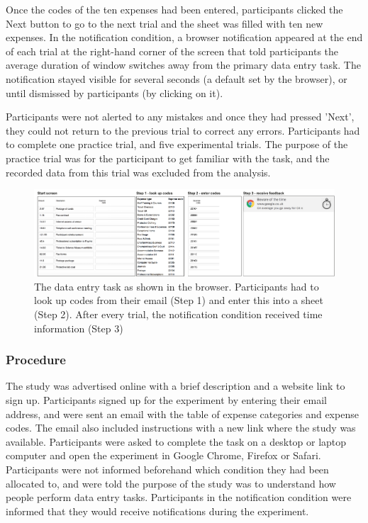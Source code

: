 Once the codes of the ten expenses had been entered, participants clicked the Next button to go to the next trial and the sheet was filled with ten new expenses. In the notification condition, a browser notification appeared at the end of each trial at the right-hand corner of the screen that told participants the average duration of window switches away from the primary data entry task. The notification stayed visible for several seconds (a default set by the browser), or until dismissed by participants (by clicking on it). 

Participants were not alerted to any mistakes and once they had pressed 'Next', they could not return to the previous trial to correct any errors. Participants had to complete one practice trial, and five experimental trials. The purpose of the practice trial was for the participant to get familiar with the task, and the recorded data from this trial was excluded from the analysis.

\begin{figure}
\centering
\includegraphics[width=\textwidth]{images/ch56/ch56-6_taskinterface.pdf}
\caption[Study 6 data entry task layout]{The data entry task as shown in the browser. Participants had to look up codes from their email (Step 1) and enter this into a sheet (Step 2). After every trial, the notification condition received time information (Step 3)}
\label{fig:ch56-6_TaskInterface}
\end{figure}

\subsubsection{Procedure}
The study was advertised online with a brief description and a website link to sign up. Participants signed up for the experiment by entering their email address, and were sent an email with the table of expense categories and expense codes. The email also included instructions with a new link where the study was available. Participants were asked to complete the task on a desktop or laptop computer and open the experiment in Google Chrome, Firefox or Safari. Participants were not informed beforehand which condition they had been allocated to, and were told the purpose of the study was to understand how people perform data entry tasks. Participants in the notification condition were informed that they would receive notifications during the experiment. 

